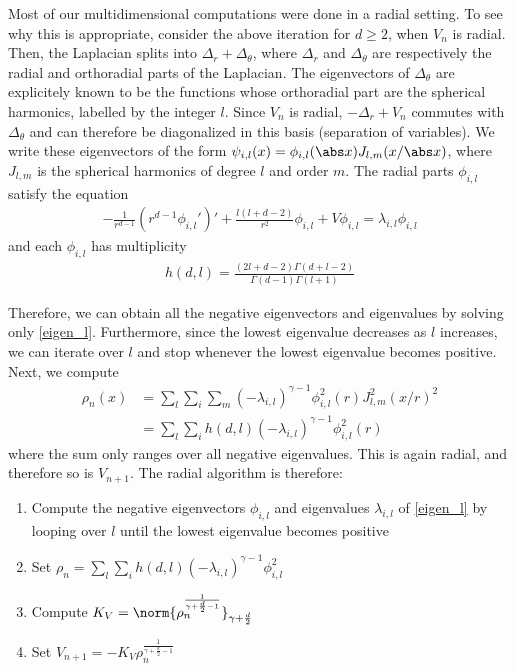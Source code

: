 \documentclass[10pt,a4paper,reqno]{amsart}
\begin{document}
Most of our multidimensional computations were done in a radial
setting. To see why this is appropriate, consider the above iteration
for $d \geq 2$, when $V_{n}$ is radial. Then, the Laplacian splits
into $\Delta_{r} + \Delta_{\theta}$, where $\Delta_{r}$ and
$\Delta_{\theta}$ are respectively the radial and orthoradial parts of
the Laplacian. The eigenvectors of $\Delta_{\theta}$ are explicitely
known to be the functions whose orthoradial part are the spherical
harmonics, labelled by the integer $l$. Since $V_{n}$ is radial,
$-\Delta_{r} + V_{n}$ commutes with $\Delta_{\theta}$ and can
therefore be diagonalized in this basis (separation of variables). We
write these eigenvectors of the form $\psi_{i,l}(x) = \phi_{i,l}(\abs
x) J_{l,m}(x/\abs x)$, where $J_{l,m}$ is the spherical harmonics of
degree $l$ and order $m$. The radial parts $\phi_{i,l}$ satisfy the
equation
\begin{align}
  \label{eigen_l}
  - \frac 1 {r^{d-1}} (r^{d-1} \phi_{i,l}')' + \frac{l(l+d-2)}{r^{2}}\phi_{i,l} +
  V \phi_{i,l} = \lambda_{i,l} \phi_{i,l}
\end{align}
and each $\phi_{i,l}$ has multiplicity\cite{seto1974}
\begin{align*}
  h(d,l) = \frac{(2l+d-2)\Gamma(d+l-2)}{\Gamma(d-1)\Gamma(l+1)}
\end{align*}

Therefore, we can obtain all the negative eigenvectors and eigenvalues
by solving only \eqref{eigen_l}. Furthermore, since the lowest
eigenvalue decreases as $l$ increases, we can iterate over $l$ and
stop whenever the lowest eigenvalue becomes positive. Next, we compute
\begin{align*}
  \rho_{n}(x) &= \sum_{l} \sum_{i} \sum_{m} (-\lambda_{i,l})^{\gamma-1}
  \phi_{i,l}^{2}(r) J_{l,m}^{2}(x/r)^{2}\\
  &= \sum_{l} \sum_{i} h(d,l) (-\lambda_{i,l})^{\gamma-1} \phi_{i,l}^{2}(r)
\end{align*}
where the sum only ranges over all negative eigenvalues. This is again
radial, and therefore so is $V_{n+1}$. The radial algorithm is therefore:

\begin{enumerate}
\item Compute the negative eigenvectors $\phi_{i,l}$ and eigenvalues
  $\lambda_{i,l}$ of \eqref{eigen_l} by looping over $l$ until the
  lowest eigenvalue becomes positive
\item Set $\rho_{n} = \sum_{l} \sum_{i} h(d,l)
  (-\lambda_{i,l})^{\gamma-1} \phi_{i,l}^{2}$
\item Compute $K_{V} = \norm{\rho_{n}^{\frac 1 {\gamma + \frac d 2 - 1}}}_{\gamma+\frac d 2}$
\item Set $V_{n+1} = - K_{V} \rho_{n}^{\frac 1 {\gamma + \frac d 2 - 1}}$
\end{enumerate}
\end{document}
